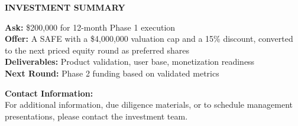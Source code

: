 \documentclass[11pt,letterpaper]{article}
\begin{document}
\begin{center}
\textbf{\Large INVESTMENT SUMMARY}

\textbf{Ask:} \$200,000 for 12-month Phase 1 execution \\
\textbf{Offer:} A SAFE with a \$4,000,000 valuation cap and a 15\% discount, converted to the next priced equity round as preferred shares \\
\textbf{Deliverables:} Product validation, user base, monetization readiness \\
\textbf{Next Round:} Phase 2 funding based on validated metrics

\vspace{1cm}

\textbf{Contact Information:} \\
For additional information, due diligence materials, or to schedule management presentations, please contact the investment team.
\end{center}

\newpage
\end{document}
